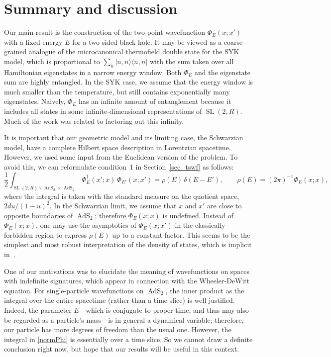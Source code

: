 \documentclass[11pt]{article}
\newcommand*{\bra}[1]{\langle{#1}|}
\newcommand*{\ket}[1]{|{#1}\rangle}
\newcommand{\RR}{\mathbb{R}}
\DeclareMathOperator{\tSL}{\widetilde{\mathrm{SL}}}
\DeclareMathOperator{\tAdS}{\widetilde{AdS}}
\def\widetilde#1{#1}%
\def\RR{R}
\begin{document}
\section{Summary and discussion}

Our main result is the construction of the two-point wavefunction $\Phi_E(x;x')$ with a fixed energy $E$ for a two-sided black hole. It may be viewed as a coarse-grained analogue of the microcanonical thermofield double state for the SYK model, which is proportional to $\sum_{n}\ket{n,n}\bra{n,n}$ with the sum taken over all Hamiltonian eigenstates in a narrow energy window. Both $\Phi_E$ and the eigenstate sum are highly entangled. In the SYK case, we assume that the energy window is much smaller than the temperature, but still contains exponentially many eigenstates. Naively, $\Phi_E$ has an infinite amount of entanglement because it includes all states in some infinite-dimensional representations of $\tSL(2,\RR)$. Much of the work was related to factoring out this infinity.

It is important that our geometric model and its limiting case, the Schwarzian model, have a complete Hilbert space description in Lorentzian spacetime. However, we used some input from the Euclidean version of the problem. To avoid this, we can reformulate condition~1 in Section~\ref{sec_tswf} as follows:
\begin{equation}\label{normPhi}
\frac{1}{2}\int_{\tSL(2,\RR)\backslash \tAdS_2 \times \tAdS_2}
\Phi^{\dagger}_E(x'; x)\,\Phi_{E'}(x; x')
=\rho(E)\,\delta(E-E'),\qquad
\rho(E)=(2\pi)^{-1}\Phi_E(x;x),
\end{equation}
where the integral is taken with the standard measure on the quotient space, $2du/(1-u)^2$. In the Schwarzian limit, we assume that $x$ and $x'$ are close to opposite boundaries of $\tAdS_2$; therefore $\Phi_E(x;x)$ is undefined. Instead of $\Phi_E(x;x)$, one may use the asymptotics of $\Phi_E(x;x')$ in the classically forbidden region to express $\rho(E)$ up to a constant factor. This seems to be the simplest and most robust interpretation of the density of states, which is implicit in~\cite{BaAlKa16,BaAlKa17}.

One of our motivations was to elucidate the meaning of wavefunctions on spaces with indefinite signatures, which appear in connection with the Wheeler-DeWitt equation. For single-particle wavefunctions on $\tAdS_2$, the inner product as the integral over the entire spacetime (rather than a time slice) is well justified. Indeed, the parameter $E$---which is conjugate to proper time, and thus may also be regarded as a particle's mass---is in general a dynamical variable; therefore, our particle has more degrees of freedom than the usual one. However, the integral in \eqref{normPhi} is essentially over a time slice. So we cannot draw a definite conclusion right now, but hope that our results will be useful in this context. 
\end{document}

